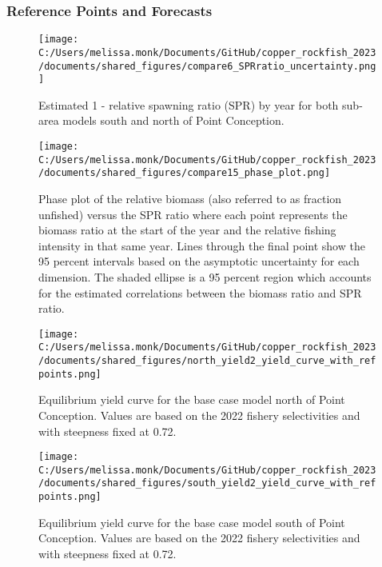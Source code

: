\documentclass[11pt,
  english,
  letterpaper,
]{article}
\begin{document}
\newpage

\hypertarget{reference-points-and-forecasts}{%
\subsubsection{Reference Points and Forecasts}\label{reference-points-and-forecasts}}

\begin{figure}
\centering
\texttt{[image: C:/Users/melissa.monk/Documents/GitHub/copper\_rockfish\_2023/documents/shared\_figures/compare6\_SPRratio\_uncertainty.png]}
\caption{Estimated 1 - relative spawning ratio (SPR) by year for both sub-area models south and north of Point Conception.\label{fig:1-spr}}
\end{figure}

\clearpage

\begin{figure}
\centering
\texttt{[image: C:/Users/melissa.monk/Documents/GitHub/copper\_rockfish\_2023/documents/shared\_figures/compare15\_phase\_plot.png]}
\caption{Phase plot of the relative biomass (also referred to as fraction unfished) versus the SPR ratio where each point represents the biomass ratio at the start of the year and the relative fishing intensity in that same year. Lines through the final point show the 95 percent intervals based on the asymptotic uncertainty for each dimension. The shaded ellipse is a 95 percent region which accounts for the estimated correlations between the biomass ratio and SPR ratio.\label{fig:phase}}
\end{figure}

\pagebreak

\begin{figure}
\centering
\texttt{[image: C:/Users/melissa.monk/Documents/GitHub/copper\_rockfish\_2023/documents/shared\_figures/north\_yield2\_yield\_curve\_with\_refpoints.png]}
\caption{Equilibrium yield curve for the base case model north of Point Conception. Values are based on the 2022 fishery selectivities and with steepness fixed at 0.72.\label{fig:yield-north}}
\end{figure}

\pagebreak

\begin{figure}
\centering
\texttt{[image: C:/Users/melissa.monk/Documents/GitHub/copper\_rockfish\_2023/documents/shared\_figures/south\_yield2\_yield\_curve\_with\_refpoints.png]}
\caption{Equilibrium yield curve for the base case model south of Point Conception. Values are based on the 2022 fishery selectivities and with steepness fixed at 0.72.\label{fig:yield-south}}
\end{figure}
\end{document}
